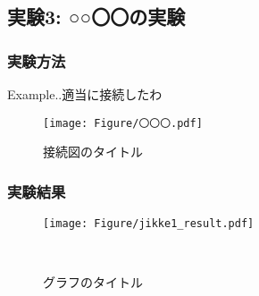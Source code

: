 \subsection{実験3: ○○〇〇の実験}
  \subsubsection{実験方法}
  Example..適当に接続したわ

    \begin{figure}[htbp]
    \centering
    \texttt{[image: Figure/〇〇〇.pdf]}
    \caption{接続図のタイトル}
    \end{figure}

  

  \clearpage
  \subsubsection{実験結果}
  

  
  \begin{figure}[htbp]
    \centering
    \texttt{[image: Figure/jikke1\_result.pdf]}
    \caption{グラフのタイトル}
　\end{figure}


\clearpage